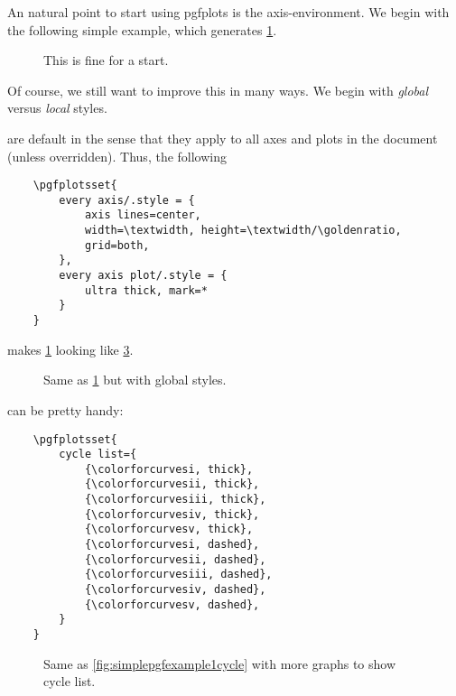 An natural point to start using pgfplots is the axis-environment. We begin with the following simple example, which generates \cref{fig:simplepgfexample1}.



\begin{figure}[h]
	\centering
	
	\caption{This is fine for a start.}
	\label{fig:simplepgfexample1}
\end{figure}
Of course, we still want to improve this in many ways. We begin with \emph{global} versus \emph{local} styles.

 are default in the sense that they apply to all axes and plots in the document (unless overridden). Thus, the following 
\begin{verbatim}
	\pgfplotsset{
		every axis/.style = {
			axis lines=center,
			width=\textwidth, height=\textwidth/\goldenratio,
			grid=both,
		},
		every axis plot/.style = {
    		ultra thick, mark=*
		}
	}
\end{verbatim}


makes \cref{fig:simplepgfexample1} looking like \cref{fig:simplepgfexample1withdefault}.

\begin{figure}[h]
	\centering
	
	\caption{Same as \cref{fig:simplepgfexample1} but with global styles.}
	\label{fig:simplepgfexample1withdefault}
\end{figure}

 can be pretty handy:

\begin{verbatim}
	\pgfplotsset{
		cycle list={
			{\colorforcurvesi, thick},
			{\colorforcurvesii, thick},
			{\colorforcurvesiii, thick},
			{\colorforcurvesiv, thick},
			{\colorforcurvesv, thick},
			{\colorforcurvesi, dashed},
			{\colorforcurvesii, dashed},
			{\colorforcurvesiii, dashed},
			{\colorforcurvesiv, dashed},
			{\colorforcurvesv, dashed},
		}
	}
\end{verbatim}

\begin{figure}[h]
	\centering
	
	\caption{Same as \cref{fig:simplepgfexample1cycle} with more graphs to show cycle list.}
	\label{fig:simplepgfexample1withdefault}
\end{figure}


